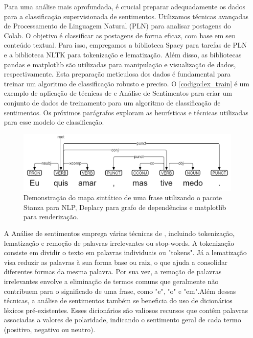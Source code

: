 Para uma análise mais aprofundada, é crucial preparar adequadamente os dados para a classificação supervisionada de sentimentos. Utilizamos técnicas avançadas de Processamento de Linguagem Natural (PLN) para analisar postagens do Colab. O objetivo é classificar as postagens de forma eficaz, com base em seu conteúdo textual. Para isso, empregamos a biblioteca Spacy para tarefas de PLN e a biblioteca NLTK para tokenização e lematização. Além disso, as bibliotecas pandas e matplotlib são utilizadas para manipulação e visualização de dados, respectivamente. Esta preparação meticulosa dos dados é fundamental para treinar um algoritmo de classificação robusto e preciso. O \autoref{codigo:lex_train} é um exemplo de aplicação de técnicas de  e Análise de Sentimentos para criar um conjunto de dados de treinamento para um algoritmo de classificação de sentimentos. Os próximos parágrafos exploram as heurísticas e técnicas utilizadas para esse modelo de classificação.

\begin{figure}[!htb]
	\caption{Demonstração do mapa sintático de uma frase utilizando o pacote Stanza para NLP, Deplacy para grafo de dependências e matplotlib para renderização.}
	\label{fig:lexicon_breakdown}
	\centering
	\includegraphics[scale=0.5]{images/lexicon_breakdown.png}
	\fautor
\end{figure}

A Análise de sentimentos emprega várias técnicas de , incluindo tokenização, lematização e remoção de palavras irrelevantes ou stop-words. A tokenização consiste em dividir o texto em palavras individuais ou "tokens". Já a lematização visa reduzir as palavras à sua forma base ou raiz, o que ajuda a consolidar diferentes formas da mesma palavra. Por sua vez, a remoção de palavras irrelevantes envolve a eliminação de termos comuns que geralmente não contribuem para o significado de uma frase, como "e", "o" e "em".Além dessas técnicas, a análise de sentimentos também se beneficia do uso de dicionários léxicos pré-existentes. Esses dicionários são valiosos recursos que contêm palavras associadas a valores de polaridade, indicando o sentimento geral de cada termo (positivo, negativo ou neutro).

